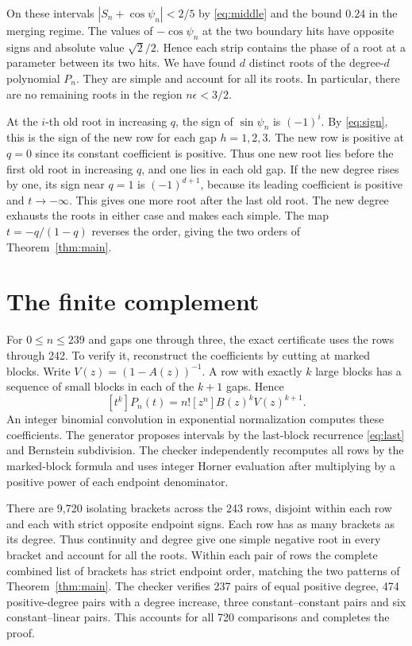 \documentclass[11pt]{article}
\begin{document}
On these intervals \(|S_n+\cos\psi_n|<2/5\) by \eqref{eq:middle}
and the bound \(0.24\) in the merging regime. The values of
\(-\cos\psi_n\) at the two boundary hits have opposite signs and
absolute value \(\sqrt{2}/2\). Hence each strip contains the phase
of a root at a parameter between its two hits. We have found
\(d\) distinct roots of the degree-\(d\) polynomial \(P_n\).
They are simple and account for all its roots. In particular,
there are no remaining roots in the region \(n\epsilon<3/2\).

At the \(i\)-th old root in increasing \(q\), the sign
of \(\sin\psi_n\) is \((-1)^i\). By \eqref{eq:sign},
this is the sign of the new row for each gap \(h=1,2,3\).
The new row is positive at \(q=0\) since its constant coefficient
is positive. Thus one new root lies before the first old root
in increasing \(q\), and one lies in each old gap. If the new
degree rises by one, its sign near \(q=1\) is \((-1)^{d+1}\),
because its leading coefficient is positive and \(t\to-\infty\).
This gives one more root after the last old root.
The new degree exhausts the roots in either case and makes each
simple. The map \(t=-q/(1-q)\) reverses the order, giving the two
orders of Theorem~\ref{thm:main}.

\section{The finite complement}

For \(0\le n\le239\) and gaps one through three, the exact certificate
uses the rows through 242. To verify it, reconstruct the coefficients
by cutting at marked blocks. Write \(V(z)=(1-A(z))^{-1}\).
A row with exactly \(k\) large blocks has a sequence of small
blocks in each of the \(k+1\) gaps. Hence
\[
 [t^k]P_n(t)=n![z^n]B(z)^k V(z)^{k+1}.
\]
An integer binomial convolution in exponential normalization computes
these coefficients. The generator proposes intervals by the
last-block recurrence \eqref{eq:last} and Bernstein subdivision.
The checker independently recomputes all rows by the marked-block
formula and uses integer Horner evaluation after multiplying by a
positive power of each endpoint denominator.

There are 9,720 isolating brackets across the 243 rows, disjoint
within each row and each with strict opposite endpoint signs.
Each row has as many brackets as its degree. Thus continuity and
degree give one simple negative root in every bracket and account
for all the roots. Within each pair of rows the complete combined
list of brackets has strict endpoint order, matching the two patterns
of Theorem~\ref{thm:main}. The checker verifies 237 pairs of equal
positive degree, 474 positive-degree pairs with a degree increase,
three constant--constant pairs and six constant--linear pairs.
This accounts for all 720 comparisons and completes the proof.
\end{document}
